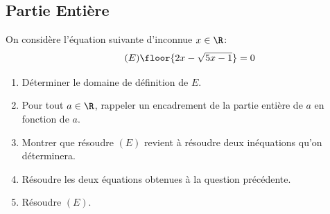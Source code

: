 \subsection{Partie Entière}


\vspace{0.5cm}
\begin{exercice}
On considère l'équation suivante d'inconnue $x\in \R$:
\begin{equation}\tag{$E$}
\floor{2x - \sqrt{5x-1}}=0
\end{equation}
\begin{enumerate}
\item Déterminer le domaine de définition de $E$.
\item  Pour tout $a\in \R$, rappeler un encadrement de la partie entière  de $a$ en fonction de $a$. 
\item Montrer que résoudre $(E)$ revient à résoudre deux inéquations qu'on déterminera. 
\item Résoudre les deux équations obtenues à la question précédente. 
\item Résoudre $(E)$. 
\end{enumerate}
\end{exercice}

